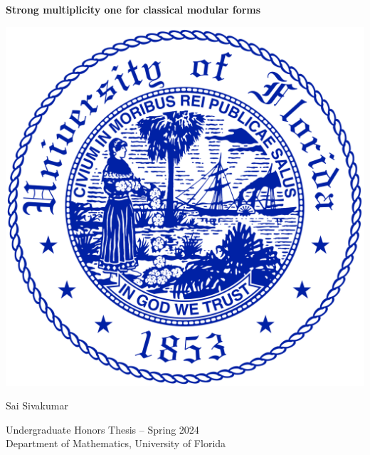 \documentclass[10pt,leqno]{article}
\begin{document}
\begin{titlepage}
    \begin{center}
        \vspace*{4em}
        {\Large\textbf{Strong multiplicity one for classical modular forms}}

        \vspace{6em}
        \includegraphics[scale=0.14]{uf.png}

        \vspace{6em}
        Sai Sivakumar

        Undergraduate Honors Thesis -- Spring 2024\\
        Department of Mathematics, University of Florida
    \end{center}
\end{titlepage}
\pagestyle{frontmatter}
\tableofcontents\newpage


\pagestyle{body}

\end{document}
